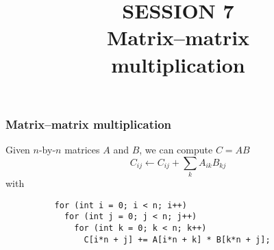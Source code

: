 \documentclass[dvipsnames,presentation,aspectratio=169,14pt]{beamer}
\date{}
\begin{document}
\title{\firasemibold\color{White}%
  {\fontsize{20}{0}\selectfont SESSION 7\\
    \fontsize{34}{34}\selectfont Matrix--matrix\\multiplication\par}}
\titleslide


\begin{frame}[fragile]
  \frametitle{Matrix--matrix multiplication}
  Given $n$-by-$n$ matrices $A$ and $B$, we can compute $C = AB$
  \begin{equation*}
    C_{ij} \gets C_{ij } + \sum_k A_{ik} B_{kj}
  \end{equation*}
  with
\begin{verbatim}
          for (int i = 0; i < n; i++)
            for (int j = 0; j < n; j++)
              for (int k = 0; k < n; k++)
                C[i*n + j] += A[i*n + k] * B[k*n + j];
\end{verbatim}

\end{frame}
\end{document}
